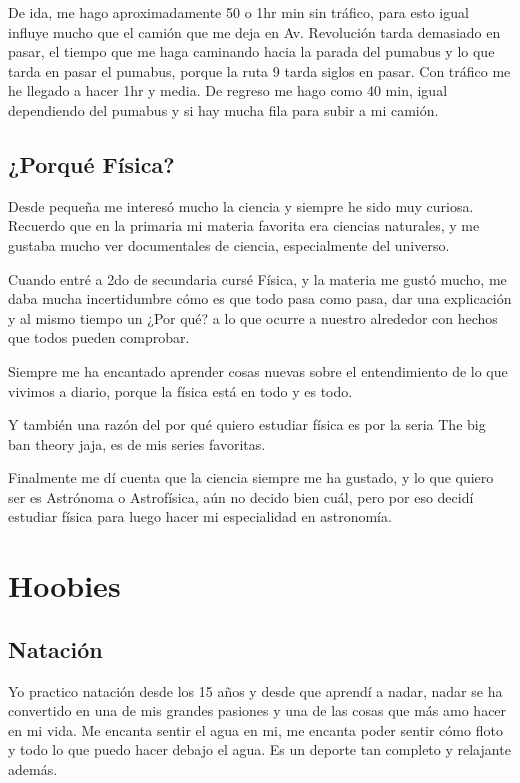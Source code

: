 \documentclass[12pt]{article}
\begin{document}
De ida, me hago aproximadamente 50 o 1hr min sin tráfico, para esto igual influye mucho que el camión que me deja en Av. Revolución tarda demasiado en pasar, el tiempo que me haga caminando hacia la parada del pumabus y lo que tarda en pasar el pumabus, porque la ruta 9 tarda siglos en pasar. Con tráfico me he llegado a hacer 1hr y media. De regreso me hago como 40 min, igual dependiendo del pumabus y si hay mucha fila para subir a mi camión.

\subsection{¿Porqué Física?}
Desde pequeña me interesó mucho la ciencia y siempre he sido muy curiosa. Recuerdo que en la primaria mi materia favorita era ciencias naturales, y me gustaba mucho ver documentales de ciencia, especialmente del universo. 



Cuando entré a 2do de secundaria cursé Física, y la materia me gustó mucho, me daba mucha incertidumbre cómo es que todo pasa como pasa, dar una explicación y al mismo tiempo un ¿Por qué? a lo que ocurre a nuestro alrededor con hechos que todos pueden comprobar. 



Siempre me ha encantado aprender cosas nuevas sobre el entendimiento de lo que vivimos a diario, porque la física está en todo y es todo.



Y también una razón del por qué quiero estudiar física es por la seria The big ban theory jaja, es de mis series favoritas.



Finalmente me dí cuenta que la ciencia siempre me ha gustado, y lo que quiero ser es Astrónoma o Astrofísica, aún no decido bien cuál, pero por eso decidí estudiar física para luego hacer mi especialidad en astronomía. 

\section{Hoobies}

\subsection{Natación}
Yo practico natación desde los 15 años y desde que aprendí a nadar, nadar se ha convertido en una de mis grandes pasiones y una de las cosas que más amo hacer en mi vida. Me encanta sentir el agua en mi, me encanta poder sentir cómo floto y todo lo que puedo hacer debajo el agua. Es un deporte tan completo y relajante además. 
\end{document}
